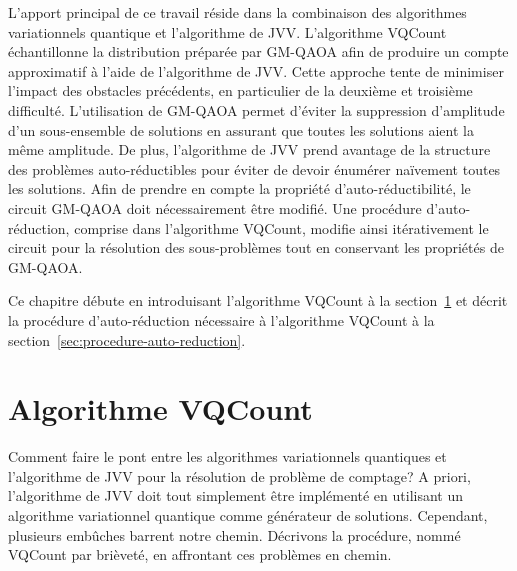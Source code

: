 L'apport principal de ce travail réside dans la combinaison des algorithmes variationnels quantique et l'algorithme de JVV. L'algorithme VQCount échantillonne la distribution préparée par GM-QAOA afin de produire un compte approximatif à l'aide de l'algorithme de JVV. Cette approche tente de minimiser l'impact des obstacles précédents, en particulier de la deuxième et troisième difficulté. L'utilisation de GM-QAOA permet d'éviter la suppression d'amplitude d'un sous-ensemble de solutions en assurant que toutes les solutions aient la même amplitude. De plus, l'algorithme de JVV prend avantage de la structure des problèmes auto-réductibles pour éviter de devoir énumérer naïvement toutes les solutions. Afin de prendre en compte la propriété d'auto-réductibilité, le circuit GM-QAOA doit nécessairement être modifié. Une procédure d'auto-réduction, comprise dans l'algorithme VQCount, modifie ainsi itérativement le circuit pour la résolution des sous-problèmes tout en conservant les propriétés de GM-QAOA.

Ce chapitre débute en introduisant l'algorithme VQCount à la section~\ref{sec:algorithme-vqcount} et décrit la procédure d'auto-réduction nécessaire à l'algorithme VQCount à la section~\ref{sec:procedure-auto-reduction}.


\section{Algorithme VQCount}
\label{sec:algorithme-vqcount}

Comment faire le pont entre les algorithmes variationnels quantiques et l'algorithme de JVV pour la résolution de problème de comptage? A priori, l'algorithme de JVV doit tout simplement être implémenté en utilisant un algorithme variationnel quantique comme générateur de solutions. Cependant, plusieurs embûches barrent notre chemin. Décrivons la procédure, nommé VQCount par brièveté, en affrontant ces problèmes en chemin.

